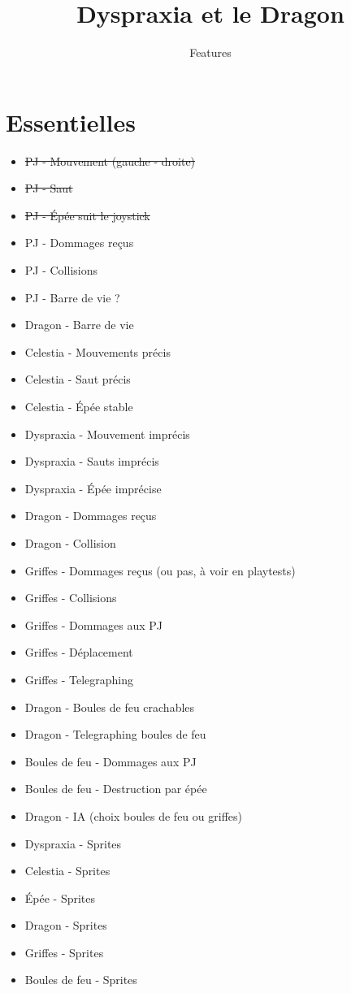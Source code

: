\documentclass{scrartcl}
\title{Dyspraxia et le Dragon}
\subtitle{Features}
\author{}
\date{}
\begin{document}
	\maketitle
	\section{Essentielles}
	\begin{itemize}
		\item \st{PJ - Mouvement (gauche - droite)}
		\item \st{PJ - Saut}
		\item \st{PJ - Épée suit le joystick}
		\item PJ - Dommages reçus
		\item PJ - Collisions
		\item PJ - Barre de vie ?
		\item Dragon - Barre de vie
		\item Celestia - Mouvements précis
		\item Celestia - Saut précis
		\item Celestia - Épée stable
		\item Dyspraxia - Mouvement imprécis
		\item Dyspraxia - Sauts imprécis
		\item Dyspraxia - Épée imprécise
		\item Dragon - Dommages reçus
		\item Dragon - Collision
		\item Griffes - Dommages reçus (ou pas, à voir en playtests)
		\item Griffes - Collisions
		\item Griffes - Dommages aux PJ
		\item Griffes - Déplacement
		\item Griffes - Telegraphing
		\item Dragon - Boules de feu crachables
		\item Dragon - Telegraphing boules de feu
		\item Boules de feu - Dommages aux PJ
		\item Boules de feu - Destruction par épée
		\item Dragon - IA (choix boules de feu ou griffes)
		\item Dyspraxia - Sprites
		\item Celestia - Sprites
		\item Épée - Sprites
		\item Dragon - Sprites
		\item Griffes - Sprites
		\item Boules de feu - Sprites
	\end{itemize}
\end{document}
